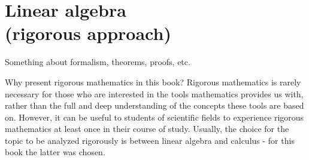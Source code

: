 \chapter{Linear algebra\\(rigorous approach)}
Something about formalism, theorems, proofs, etc.

\begin{note}{Why present rigorous mathematics in this book?}{ }
	Rigorous mathematics is rarely necessary for those who are interested in the tools mathematics provides us with, rather than the full and deep understanding of the concepts these tools are based on. However, it can be useful to students of scientific fields to experience rigorous mathematics at least once in their course of study. Usually, the choice for the topic to be analyzed rigorously is between linear algebra and calculus - for this book the latter was chosen.
\end{note}
